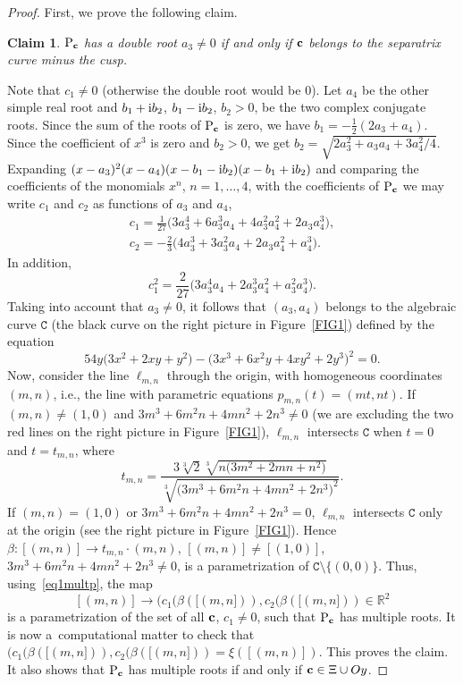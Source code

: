 \documentclass[10pt,a4paper]{amsart}
\numberwithin{equation}{section}
\newtheorem*{Claim*}{Claim}
\def\R{\mathbb{R}}
\begin{document}
\begin{proof}
First, we prove the following claim.

\begin{Claim*} ${\rm P}_{{\bf c}}$ has a double root $a_3\neq 0$ if and only {if} ${\bf c}$ belongs
to the separatrix curve minus the cusp.
\end{Claim*}

Note that $c_1\neq 0$ (otherwise the double root would be $0$). Let $a_4$ be the other simple real root and $b_1+{\rm i}b_2$,
$b_1-{\rm i}b_2$, $b_2>0$, be the two complex conjugate roots.
Since the sum of the roots of ${\rm P}_{{\bf c}}$ is zero, we have $b_1=-\frac{1}{2}(2a_3+a_4)$.
Since the coefficient of $x^3$ is zero and $b_2>0$, we get $b_2=\sqrt{2a_3^2+a_3a_4+3a_4^2/4}$.
Expanding $(x-a_3)^2(x-a_4)(x-b_1-{\rm i}b_2)(x-b_1+{\rm i}b_2)$
and comparing the {coefficients} of the
monomials $x^n$, $n=1,\dots, 4$, with the coefficients of ${\rm P}_{{\bf c}}$ we may write $c_1$ and
$c_2$ as functions of $a_3$ and $a_4$,
\begin{gather}
 c_1=\frac{1}{27}\big(3a_3^4+6a_3^3a_4+4a_3^2a_4^2+2a_3a_4^3\big),\nonumber\\
c_2=-\frac{2}{3}\big(4a_3^3+3a_3^2a_4+2a_3a_4^2+a_4^3\big).\label{eq1multp}
\end{gather}
In addition,
\[
 c_1^2=\frac{2}{27}\big(3a_3^4a_4+2a_3^3a_4^2+a_3^2a_4^3\big).
\]
Taking into account that $a_3\neq 0$, it follows that $(a_3,a_4)$ belongs to the algebraic curve
${\mathtt C}$ (the black curve on the right picture in Figure~\ref{FIG1}) defined by the equation
\[
 54y\big(3x^2+2xy+y^2\big)-\big(3x^3+6x^2y+4xy^2+2y^3\big)^2=0.
\]
Now, consider the line $\ell_{m,n}$ through the origin, with homogeneous coordinates $(m,n)$, i.e., the line with parametric
equations $p_{m,n}(t)=(mt,nt)$.
If $(m,n)\neq (1,0)$ and $3m^3+6m^2n+4mn^2+2n^3\neq 0$ (we are excluding the two red lines
on the right picture in Figure~\ref{FIG1}), $\ell_{m,n}$
intersects ${\mathtt C}$ when $t=0$ and $t=t_{m,n}$,
where
\[
 t_{m,n}=\frac{3\sqrt[3]{2}\sqrt[3]{n\big(3m^2+2mn+n^2\big)}}{\sqrt[3]{\big(3m^3+6m^2n+4mn^2+2n^3\big)^2}}.
\]
If {$(m,n)= (1,0)$}
or $3m^3+6m^2n+4mn^2+2n^3= 0$, $\ell_{m,n}$ intersects ${\mathtt C}$ only at the origin
(see the right picture in Figure~\ref{FIG1}). Hence
$\beta \colon [(m,n)]\to t_{m,n}\cdot (m,n)$, $[(m,n)]\neq [(1,0)]$,
$3m^3+6m^2n+4mn^2+2n^3\neq 0$, is a parametrization of ${\mathtt C}\setminus \{(0,0)\}$.
Thus, using~\eqref{eq1multp}, the map
\[
 [(m,n)]\to (c_1(\beta([(m,n])),c_2(\beta([(m,n]))\in \R^2
\]
is a parametrization of the set of all ${\bf c}$, $c_1\neq 0$, such that $\mathrm{P}_{{\bf c}}$ has multiple roots.
It is now a~computational matter to check that
$(c_1(\beta([(m,n])),c_2(\beta([(m,n]))=\xi([(m,n)])$. This proves the claim. It also shows that ${\rm P}_{{\bf c}}$
has multiple roots if and only if ${\bf c}\in \Xi\cup Oy$.



\end{proof}
\end{document}
